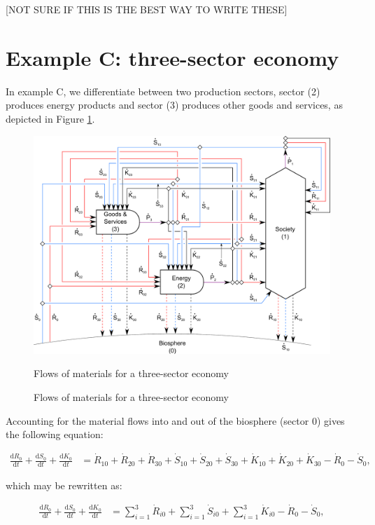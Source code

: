 [NOT SURE IF THIS IS THE BEST WAY TO WRITE THESE]


\section{Example C: three-sector economy} %
\label{sec:C_materials}

In example C, we differentiate between two production sectors, sector (2) produces energy
products and sector (3) produces other goods and services, as depicted in Figure
\ref{fig:C_materials}.

\begin{figure}[h!]
\centering
\includegraphics[width=0.8\linewidth]{Part_1/Chapter_Materials/images/3_sector_materials.pdf}
\caption{Flows of materials for a three-sector economy}{Flows of materials for a three-sector economy}
\label{fig:C_materials}
\end{figure}

Accounting for the material flows into and out of the biosphere (sector 0) gives the following equation:

\begin{align} \label{eq:C_CV_0}
	\frac{\mathrm{d}R_{0}}{\mathrm{d}t} 
	+ \frac{\mathrm{d}S_{0}}{\mathrm{d}t}	
	+ \frac{\mathrm{d}K_0}{\mathrm{d}t}		
	& =  \dot{R}_{10} + \dot{R}_{20} + \dot{R}_{30}
	+ \dot{S}_{10} + \dot{S}_{20} + \dot{S}_{30}
	+ \dot{K}_{10} + \dot{K}_{20} + \dot{K}_{30}
	- \dot{R}_{0} 
	- \dot{S}_{0},
\end{align}

\noindent which may be rewritten as:

\begin{align} \label{eq:C_CV_0_b}
	\frac{\mathrm{d}R_{0}}{\mathrm{d}t} 
	+ \frac{\mathrm{d}S_{0}}{\mathrm{d}t}	
	+ \frac{\mathrm{d}K_0}{\mathrm{d}t}		
	& =  \sum_{i = 1}^{3}\dot{R}_{i0}
	+ \sum_{i = 1}^{3}\dot{S}_{i0}
	+ \sum_{i = 1}^{3}\dot{K}_{i0}
	- \dot{R}_{0} 
	- \dot{S}_{0},
\end{align}

